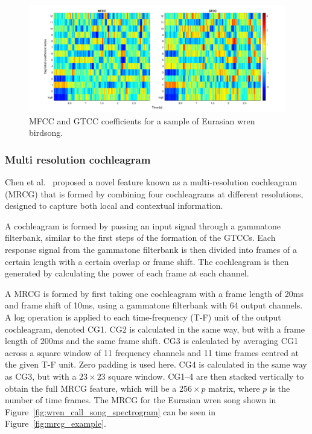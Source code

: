 \begin{figure}[ht]
  \centering
  \includegraphics[width=\textwidth]{figures/mfcc_gtcc_example.png}
  \caption{MFCC and GTCC coefficients for a sample of Eurasian wren
  birdsong.}\label{fig:mfcc_gtcc_example}
\end{figure}

\subsubsection{Multi resolution cochleagram}

Chen et al.~\cite{chen2014feature} proposed a novel feature known as a
multi-resolution cochleagram (MRCG) that is formed by combining four
cochleagrams at different resolutions, designed to capture both local and
contextual information.

A cochleagram is formed by passing an input signal through a gammatone
filterbank, similar to the first steps of the formation of the GTCCs\@. Each
response signal from the gammatone filterbank is then divided into frames of a
certain length with a certain overlap or frame shift. The cochleagram is then
generated by calculating the power of each frame at each channel.

A MRCG is formed by first taking one cochleagram with a frame length of 20ms and
frame shift of 10ms, using a gammatone filterbank with 64 output channels. A log
operation is applied to each time-frequency (T-F) unit of the output
cochleagram, denoted CG1. CG2 is calculated in the same way, but with a frame
length of 200ms and the same frame shift. CG3 is calculated by averaging CG1
across a square window of 11 frequency channels and 11 time frames centred at
the given T-F unit. Zero padding is used here. CG4 is calculated in the same way
as CG3, but with a $23 \times 23$ square window. CG1--4 are then stacked
vertically to obtain the full MRCG feature, which will be a $256 \times p$
matrix, where $p$ is the number of time frames. The MRCG for the Eurasian wren
song shown in Figure~\ref{fig:wren_call_song_spectrogram} can be seen in
Figure~\ref{fig:mrcg_example}.

